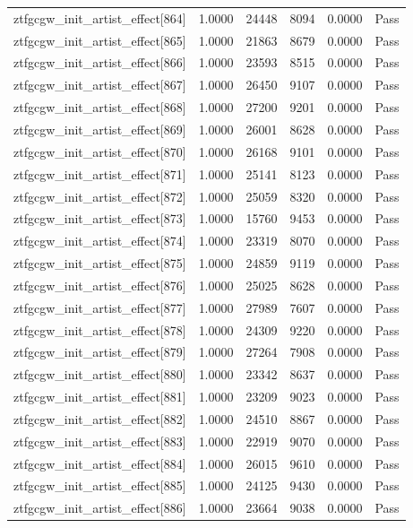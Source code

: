 \begin{table}[htbp]
\begin{tabular}{llrrll}
ztfgcgw\_init\_artist\_effect[864] & 1.0000 & 24448 & 8094 & 0.0000 & Pass \\
ztfgcgw\_init\_artist\_effect[865] & 1.0000 & 21863 & 8679 & 0.0000 & Pass \\
ztfgcgw\_init\_artist\_effect[866] & 1.0000 & 23593 & 8515 & 0.0000 & Pass \\
ztfgcgw\_init\_artist\_effect[867] & 1.0000 & 26450 & 9107 & 0.0000 & Pass \\
ztfgcgw\_init\_artist\_effect[868] & 1.0000 & 27200 & 9201 & 0.0000 & Pass \\
ztfgcgw\_init\_artist\_effect[869] & 1.0000 & 26001 & 8628 & 0.0000 & Pass \\
ztfgcgw\_init\_artist\_effect[870] & 1.0000 & 26168 & 9101 & 0.0000 & Pass \\
ztfgcgw\_init\_artist\_effect[871] & 1.0000 & 25141 & 8123 & 0.0000 & Pass \\
ztfgcgw\_init\_artist\_effect[872] & 1.0000 & 25059 & 8320 & 0.0000 & Pass \\
ztfgcgw\_init\_artist\_effect[873] & 1.0000 & 15760 & 9453 & 0.0000 & Pass \\
ztfgcgw\_init\_artist\_effect[874] & 1.0000 & 23319 & 8070 & 0.0000 & Pass \\
ztfgcgw\_init\_artist\_effect[875] & 1.0000 & 24859 & 9119 & 0.0000 & Pass \\
ztfgcgw\_init\_artist\_effect[876] & 1.0000 & 25025 & 8628 & 0.0000 & Pass \\
ztfgcgw\_init\_artist\_effect[877] & 1.0000 & 27989 & 7607 & 0.0000 & Pass \\
ztfgcgw\_init\_artist\_effect[878] & 1.0000 & 24309 & 9220 & 0.0000 & Pass \\
ztfgcgw\_init\_artist\_effect[879] & 1.0000 & 27264 & 7908 & 0.0000 & Pass \\
ztfgcgw\_init\_artist\_effect[880] & 1.0000 & 23342 & 8637 & 0.0000 & Pass \\
ztfgcgw\_init\_artist\_effect[881] & 1.0000 & 23209 & 9023 & 0.0000 & Pass \\
ztfgcgw\_init\_artist\_effect[882] & 1.0000 & 24510 & 8867 & 0.0000 & Pass \\
ztfgcgw\_init\_artist\_effect[883] & 1.0000 & 22919 & 9070 & 0.0000 & Pass \\
ztfgcgw\_init\_artist\_effect[884] & 1.0000 & 26015 & 9610 & 0.0000 & Pass \\
ztfgcgw\_init\_artist\_effect[885] & 1.0000 & 24125 & 9430 & 0.0000 & Pass \\
ztfgcgw\_init\_artist\_effect[886] & 1.0000 & 23664 & 9038 & 0.0000 & Pass \\

\end{tabular}
\end{table}
